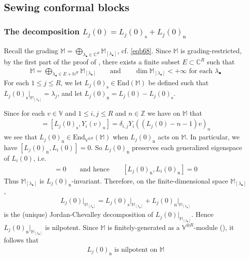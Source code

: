 \documentclass[11pt,b5paper,notitlepage]{article}
\theoremstyle{definition}
\theoremstyle{plain}
\newcommand{\End}{\mathrm{End}} %
\newcommand{\blt}{\bullet}
\newcommand{\Vbb}{\mathbb V}
\newcommand{\Mbb}{\mathbb M}
\newcommand{\Cbb}{\mathbb C}
\newcommand{\Nbb}{\mathbb N}
\newcommand{\Zbb}{\mathbb Z}
\newcommand{\Ljss}{{L_j(0)_\mathrm{s}}}
\newcommand{\Ljni}{{L_j(0)_\mathrm{n}}}
\newcommand{\<}{\left\langle}
\renewcommand{\>}{\right\rangle}
\newcommand{\Lini}{{L_i(0)_\mathrm{n}}}
\newcommand{\Liss}{{L_i(0)_\mathrm{s}}}
\numberwithin{equation}{section}
\begin{document}
\subsection{Sewing conformal blocks}


\subsubsection{The decomposition $L_j(0)=\Ljss+\Ljni$}


Recall the grading $\Mbb=\bigoplus_{\lambda_\blt\in\Cbb^R}\Mbb_{[\lambda_\blt]}$, cf. \eqref{eqb68}.   Since $\Mbb$ is grading-restricted, by the first part of the proof of \cite[Thm. A.14]{GZ1}, there exists a finite subset $E\subset\Cbb^R$ such that
\begin{gather}\label{eqb72}
\Mbb=\bigoplus_{\lambda_\blt\in E+\Nbb^R}\Mbb_{[\lambda_\blt]}\qquad\text{and}\qquad \dim\Mbb_{[\lambda_\blt]}<+\infty\text{ for each }\lambda_\blt
\end{gather}
For each $1\leq j\leq R$, we let $\Ljss\in\End(\Mbb)$ be defined such that $\Ljss\big|_{\Mbb_{[\lambda_\blt]}}=\lambda_j$, and let $\Ljni=L_j(0)-\Ljss$. 

Since for each $v\in\Vbb$ and $1\leq i,j\leq R$ and $n\in\Zbb$ we have on $\Mbb$ that
\begin{align*}
[L_j(0),Y_i(v)_n]=[\Ljss,Y_i(v)_n]=\delta_{i,j}Y_i((L_j(0)-n-1)v)_n
\end{align*}
we see that $\Ljni\in\End_{\Vbb^{\otimes R}}(\Mbb)$ when $\Ljni$ acts on $\Mbb$. In particular, we have $[\Ljni,L_i(0)]=0$. So $\Ljni$ preserves each generalized eigenspace of $L_i(0)$, i.e.
\begin{align*}
[\Ljni,\Liss]=0\qquad\text{and hence}\qquad[\Ljni,\Lini]=0
\end{align*}
Thus $\Mbb_{[\lambda_\blt]}$ is $\Ljni$-invariant. Therefore, on the finite-dimensional space $\Mbb_{[\lambda_\blt]}$,
\begin{align*}
L_j(0)\big|_{\Mbb_{[\lambda_\blt]}}=\Ljss\big|_{\Mbb_{[\lambda_\blt]}}+\Ljni\big|_{\Mbb_{[\lambda_\blt]}}
\end{align*}
is the (unique) Jordan-Chevalley decomposition of $L_j(0)\big|_{\Mbb_{[\lambda_\blt]}}$. Hence $\Ljni\big|_{\Mbb_{[\lambda_\blt]}}$ is nilpotent. Since $\Mbb$ is finitely-generated as a $\Vbb^{\otimes R}$-module (\cite{Hua-projectivecover}), it follows that
\begin{align}\label{eqb70}
\Ljni\text{ is nilpotent on }\Mbb
\end{align}
\end{document}
